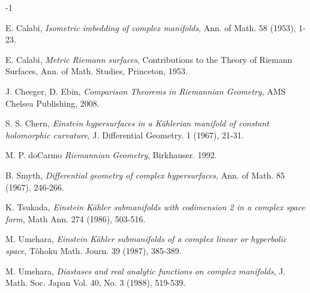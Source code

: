 \begin{thebibliography}{-1}

\parskip 4pt

 E. Calabi, {\it Isometric imbedding of complex manifolds},
Ann. of Math. 58 (1953), 1-23.

\smallskip

 E. Calabi, {\it Metric Riemann surfaces},
Contributions to the Theory of Riemann Surfaces, Ann. of Math.
Studies, Princeton, 1953.

\smallskip

 J. Cheeger, D. Ebin, {\it Comparison Theorems in Riemannian Geometry}, AMS Chelsea Publishing, 2008.

\smallskip

 S. S. Chern, {\it Einstein hypersurfaces in a K\"ahlerian manifold of constant
holomorphic curvature}, J. Differential Geometry. 1 (1967), 21-31.

\smallskip

 M. P. doCarmo {\it Riemannian Geometry}, Birkhauser. 1992. 

\smallskip

 B. Smyth, {\it Differential geometry of complex hypersurfaces},
Ann. of Math. 85 (1967), 246-266.

\smallskip

 K. Tsukada, {\it Einstein K\"ahler submanifolds with codimension 2 in a complex space form},
Math Ann. 274 (1986), 503-516.

\smallskip

 M. Umehara, {\it Einstein K\"ahler submanifolds of
a complex linear or hyperbolic space}, T\^{o}hoku Math. Journ. 39
(1987), 385-389.

\smallskip

 M. Umehara, {\it Diastases and real analytic functions on complex
manifolds}, J. Math. Soc. Japan Vol. 40, No. 3 (1988), 519-539.

\end{thebibliography}
